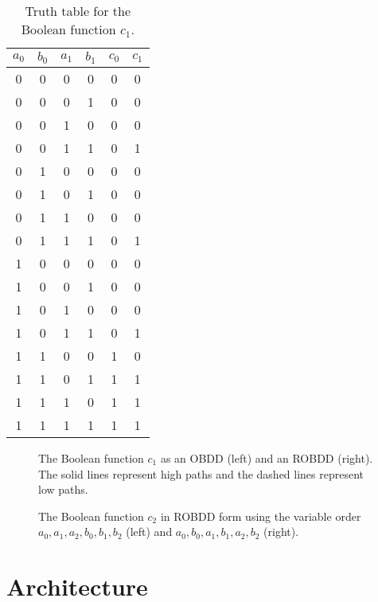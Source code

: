 \documentclass[a4paper,11pt]{kth-mag}
\begin{document}
\begin{table}
\centering
\begin{tabular}{cccc|cc}
$a_0$ & $b_0$ & $a_1$ & $b_1$ & $c_0$ & $c_1$ \\
\hline
0     & 0     & 0     & 0     & 0     & 0 \\
0     & 0     & 0     & 1     & 0     & 0 \\
0     & 0     & 1     & 0     & 0     & 0 \\
0     & 0     & 1     & 1     & 0     & 1 \\
0     & 1     & 0     & 0     & 0     & 0 \\
0     & 1     & 0     & 1     & 0     & 0 \\
0     & 1     & 1     & 0     & 0     & 0 \\
0     & 1     & 1     & 1     & 0     & 1 \\
1     & 0     & 0     & 0     & 0     & 0 \\
1     & 0     & 0     & 1     & 0     & 0 \\
1     & 0     & 1     & 0     & 0     & 0 \\
1     & 0     & 1     & 1     & 0     & 1 \\
1     & 1     & 0     & 0     & 1     & 0 \\
1     & 1     & 0     & 1     & 1     & 1 \\
1     & 1     & 1     & 0     & 1     & 1 \\
1     & 1     & 1     & 1     & 1     & 1 \\
\end{tabular}
\caption{Truth table for the Boolean function $c_1$.}
\label{tab:tt_c1}
\end{table}

\begin{figure}[p]
\centering

\caption{The Boolean function $c_1$ as an OBDD (left) and an ROBDD (right). The solid lines represent high paths and the dashed lines represent low paths.}
\label{fig:bdd_c1}
\end{figure}

\begin{figure}[p]
\centering

\caption{The Boolean function $c_2$ in ROBDD form using the variable order $a_0,a_1,a_2,b_0,b_1,b_2$ (left) and $a_0,b_0,a_1,b_1,a_2,b_2$ (right).}
\label{fig:bdd_c2_bad}
\end{figure}

\chapter{Architecture}
\label{ch:architecture}
\end{document}
